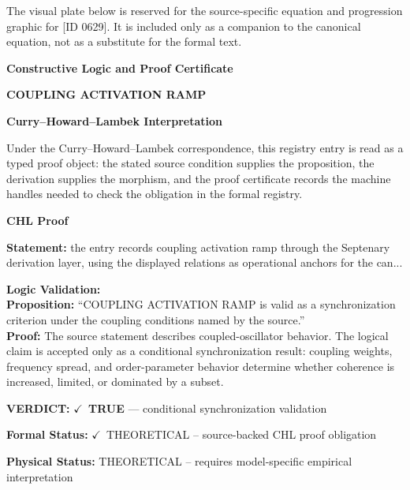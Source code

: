 \begingroup\footnotesize\sloppy
The visual plate below is reserved for the source-specific equation and progression graphic for [ID 0629]. It is included only as a companion to the canonical equation, not as a substitute for the formal text.
\par\endgroup
\ifTZPDarkEdition
{}
\fi

\clearpage
\begingroup\tzpsupportsetup
\noindent\textbf{\fontsize{10.8pt}{12.8pt}\selectfont [ID 0629] Constructive Logic and Proof Certificate}\par
\noindent\textbf{\fontsize{10pt}{12pt}\selectfont COUPLING ACTIVATION RAMP}\par
\vspace{0.45em}
\begingroup
\footnotesize
\setlength{\parskip}{0.22em}
\setlength{\parindent}{0pt}
\noindent\textbf{Curry--Howard--Lambek Interpretation}\par
Under the Curry--Howard--Lambek correspondence, this registry entry is read as a typed proof
object: the stated source condition supplies the proposition, the derivation supplies the
morphism, and the proof certificate records the machine handles needed to check the obligation
in the formal registry.

\vspace{0.45em}
\noindent\textbf{CHL Proof}\par
\textbf{Statement:} the entry records coupling activation ramp through the Septenary derivation layer, using
the displayed relations as operational anchors for the can...

\textbf{Logic Validation:}\\
\textbf{Proposition:} ``COUPLING ACTIVATION RAMP is valid as a synchronization criterion under the coupling
conditions named by the source.''\\
\textbf{Proof:} The source statement describes coupled-oscillator behavior. The logical claim is
accepted only as a conditional synchronization result: coupling weights, frequency
spread, and order-parameter behavior determine whether coherence is increased, limited,
or dominated by a subset.

\textbf{VERDICT:} \ensuremath{\checkmark}\ \textbf{TRUE} --- conditional synchronization validation

\textbf{Formal Status:} \ensuremath{\checkmark}\ THEORETICAL -- source-backed CHL proof obligation

\textbf{Physical Status:} THEORETICAL -- requires model-specific empirical interpretation
\par\vspace{0.45em}
\par
\ifTZPDarkEdition
{}
\fi
\endgroup
\endgroup
